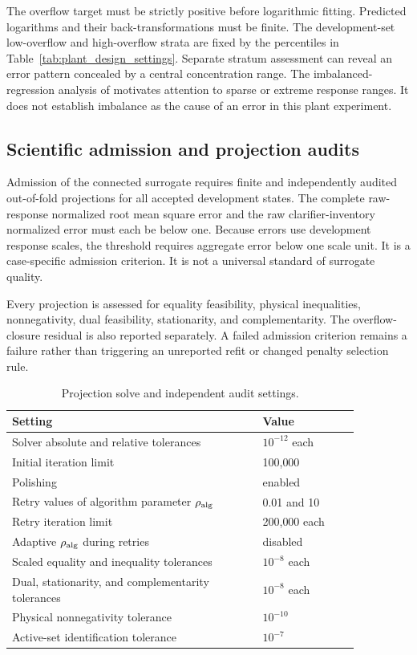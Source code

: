 The overflow target must be strictly positive before logarithmic fitting. Predicted logarithms and their back-transformations must be finite. The development-set low-overflow and high-overflow strata are fixed by the percentiles in Table~\ref{tab:plant_design_settings}. Separate stratum assessment can reveal an error pattern concealed by a central concentration range. The imbalanced-regression analysis of \citet{Shahbazi2026} motivates attention to sparse or extreme response ranges. It does not establish imbalance as the cause of an error in this plant experiment.

\subsection{Scientific admission and projection audits}

Admission of the connected surrogate requires finite and independently audited out-of-fold projections for all accepted development states. The complete raw-response normalized root mean square error and the raw clarifier-inventory normalized error must each be below one. Because errors use development response scales, the threshold requires aggregate error below one scale unit. It is a case-specific admission criterion. It is not a universal standard of surrogate quality.

Every projection is assessed for equality feasibility, physical inequalities, nonnegativity, dual feasibility, stationarity, and complementarity. The overflow-closure residual is also reported separately. A failed admission criterion remains a failure rather than triggering an unreported refit or changed penalty selection rule.

\begin{table}[htbp]
\centering\small
\caption{Projection solve and independent audit settings.}
\label{tab:plant_projection_settings}
\begin{tabular}{p{0.62\linewidth}p{0.24\linewidth}}
\toprule Setting & Value\\\midrule
Solver absolute and relative tolerances & $10^{-12}$ each\\
Initial iteration limit & 100{,}000\\
Polishing & enabled\\
Retry values of algorithm parameter $\rho_{\rm alg}$ & 0.01 and 10\\
Retry iteration limit & 200{,}000 each\\
Adaptive $\rho_{\rm alg}$ during retries & disabled\\
Scaled equality and inequality tolerances & $10^{-8}$ each\\
Dual, stationarity, and complementarity tolerances & $10^{-8}$ each\\
Physical nonnegativity tolerance & $10^{-10}$\\
Active-set identification tolerance & $10^{-7}$\\
\bottomrule
\end{tabular}
\end{table}

